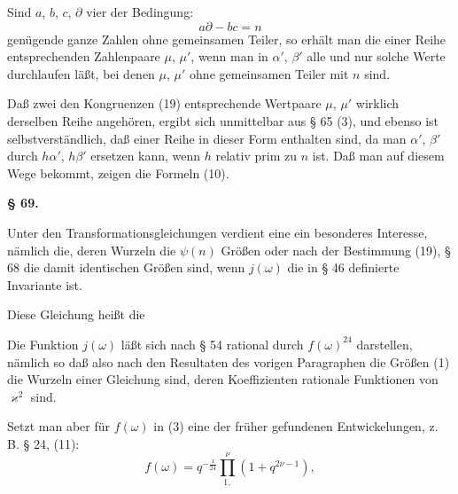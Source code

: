 Sind $a$, $b$, $c$, $\partial$ vier der Bedingung:
\[
a\partial - bc = n
\]
genügende ganze Zahlen ohne gemeinsamen Teiler, so erhält man
die einer Reihe entsprechenden Zahlenpaare $\mu$, $\mu'$, wenn man in
$\alpha'$, $\beta'$ alle und nur solche Werte durchlaufen läßt, bei denen
$\mu$, $\mu'$ ohne gemeinsamen Teiler mit $n$ sind.

Daß zwei den Kongruenzen (19) entsprechende Wertpaare $\mu$, $\mu'$
wirklich derselben Reihe angehören, ergibt sich unmittelbar
aus § 65 (3), und ebenso ist selbstverständlich, daß 
einer Reihe in dieser Form enthalten sind, da man $\alpha'$, $\beta'$
durch $h\alpha'$, $h\beta'$ ersetzen kann, wenn $h$ relativ prim zu $n$ ist. Daß
man  auf diesem Wege bekommt, zeigen
die Formeln (10).

\begin{center}
\textbf{§ 69.} \textbf{}
\end{center}

Unter den Transformationsgleichungen verdient eine ein besonderes
Interesse, nämlich die, deren Wurzeln die $\psi(n)$ Größen
oder nach der Bestimmung (19), § 68 die damit identischen
Größen
sind, wenn $j(\omega)$ die in § 46 definierte Invariante ist.

Diese Gleichung heißt die 

Die Funktion $j(\omega)$ läßt sich nach § 54 rational durch $f(\omega)^{24}$
darstellen, nämlich
so daß also nach den Resultaten des vorigen Paragraphen die
Größen (1) die Wurzeln einer Gleichung sind, deren Koeffizienten
rationale Funktionen von $\varkappa^2$ sind.

Setzt man aber für $f(\omega)$ in (3) eine der früher gefundenen
Entwickelungen, z. B. § 24, (11):
\[
f(\omega) = q^{-\frac{1}{24}} \prod_{1,}^{\nu} (1+q^{2\nu-1}),
\]
